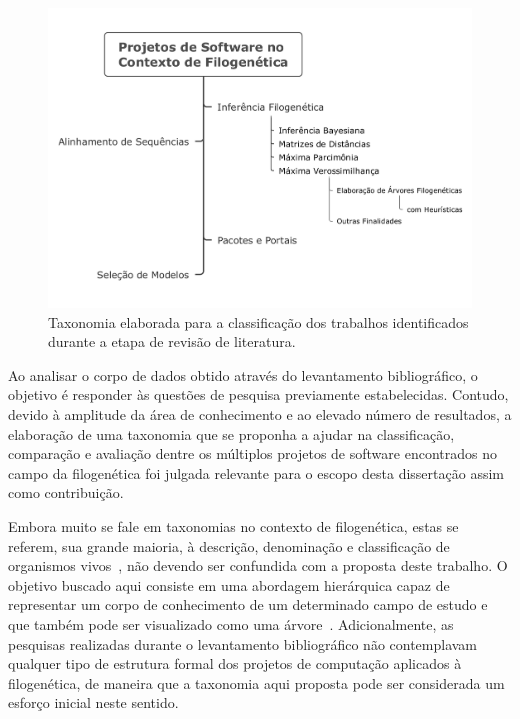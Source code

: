 \documentclass[english,brazilian]{UNISINOSmonografia} %
\newcommand\defaultFigureWidth{0.9}
\begin{document}
\begin{figure}[tb]
	\centering%
	\begin{minipage}{\defaultFigureWidth\textwidth}
		\caption{Taxonomia elaborada para a classificação dos trabalhos identificados durante a etapa de revisão de literatura.}
		\label{fig:taxonomia}
		\includegraphics[trim=15 40 15 40,clip,width=\textwidth]{taxonomia}
	\end{minipage}
\end{figure}


Ao analisar o corpo de dados obtido através do levantamento bibliográfico, o objetivo é responder às questões de pesquisa previamente estabelecidas.
Contudo, devido à amplitude da área de conhecimento e ao elevado número de resultados, a elaboração de uma taxonomia que se proponha a ajudar na classificação, comparação e avaliação dentre os múltiplos projetos de software encontrados no campo da filogenética foi julgada relevante para o escopo desta dissertação assim como contribuição.


Embora muito se fale em taxonomias no contexto de filogenética, estas se referem, sua grande maioria, à descrição, denominação e classificação de organismos vivos~\cite{yang2014molecular}, não devendo ser confundida com a proposta deste trabalho.
%
O objetivo buscado aqui consiste em uma abordagem hierárquica capaz de representar um corpo de conhecimento de um determinado campo de estudo e que também pode ser visualizado como uma árvore~\cite{Denning2009}.
%
Adicionalmente, as pesquisas realizadas durante o levantamento bibliográfico não contemplavam qualquer tipo de estrutura formal dos projetos de computação aplicados à filogenética, de maneira que a taxonomia aqui proposta pode ser considerada um esforço inicial neste sentido.
\end{document}
